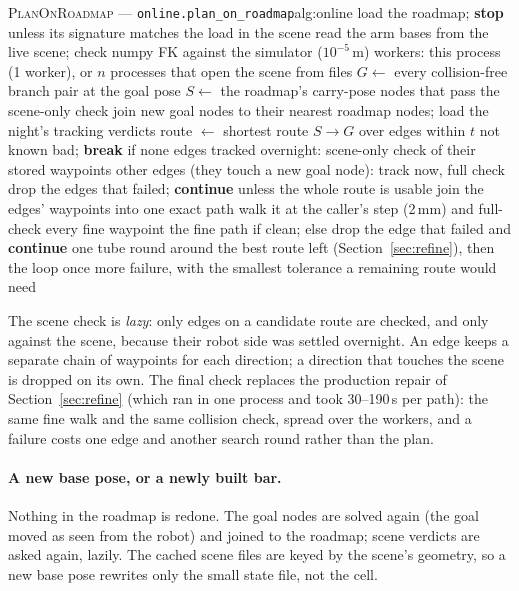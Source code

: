 \begin{algo}{\textsc{PlanOnRoadmap} --- \texttt{online.plan\_on\_roadmap}}{alg:online}
  \State load the roadmap; \textbf{stop} unless its signature matches the load in the scene 
  \State read the arm bases from the live scene; check numpy FK against the simulator ($10^{-5}$\,m)
  \State workers: this process (1 worker), or $n$ processes that open the scene from files
  \State $G \gets$ every collision-free branch pair at the goal pose 
  \State $S \gets$ the roadmap's carry-pose nodes that pass the scene-only check
  \State join new goal nodes to their nearest roadmap nodes; load the night's tracking verdicts
    \Loop
      \State route $\gets$ shortest route $S \to G$ over edges within $t$ not known bad; \textbf{break} if none
      \State edges tracked overnight: scene-only check of their stored waypoints 
      \State other edges (they touch a new goal node): track now, full check 
      \State drop the edges that failed; \textbf{continue} unless the whole route is usable
      \State join the edges' waypoints into one exact path 
      \State walk it at the caller's step (2\,mm) and full-check every fine waypoint 
      \State \Return the fine path if clean; else drop the edge that failed and \textbf{continue}
    \EndLoop
  \EndFor
  \State one tube round around the best route left (Section~\ref{sec:refine}), then the loop once more
  \State \Return failure, with the smallest tolerance a remaining route would need
\EndFunction
\end{algo}

\noindent
The scene check is \emph{lazy}: only edges on a candidate route are checked, and
only against the scene, because their robot side was settled overnight. An edge
keeps a separate chain of waypoints for each direction; a direction that touches
the scene is dropped on its own. The final check replaces the production repair
of Section~\ref{sec:refine} (which ran in one process and took 30--190\,s per
path): the same fine walk and the same collision check, spread over the workers,
and a failure costs one edge and another search round rather than the plan.

\paragraph{A new base pose, or a newly built bar.} Nothing in the roadmap is
redone. The goal nodes are solved again (the goal moved as seen from the robot)
and joined to the roadmap; scene verdicts are asked again, lazily. The cached
scene files are keyed by the scene's geometry, so a new base pose rewrites only
the small state file, not the cell.

